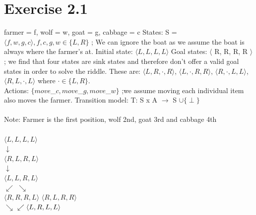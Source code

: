 \documentclass[12pt]{article}
\begin{document}
\section*{Exercise 2.1}
farmer = f, wolf = w, goat = g, cabbage = c \newline \newline
States:  S = $\langle f, w, g, c \rangle, f, c, g, w \in \{ L, R \}$ ; We can ignore the boat as we assume the boat is always where the farmer's at.\newline
Initial state: $\langle L, L, L, L \rangle$ \newline
Goal states: $\langle$ R, R, R, R $\rangle$ ; we find that four states are sink states and therefore don't offer a valid goal states in order to solve the riddle. These are: $\langle L, R, \cdot , R \rangle$, $\langle L, \cdot , R, R \rangle$, $\langle R, \cdot, L, L \rangle$, $\langle R, L, \cdot, L \rangle$ where $\cdot \in \{ L, R \}.$ \\
Actions: $\{ move$\_$c, move$\_$g, move$\_$w\}$ ;we assume moving each individual item also moves the farmer.  \newline
Transition model: T: S x A $\to$ S $\cup \{\perp \}$ \\ \\ 
Note: Farmer is the first position, wolf 2nd, goat 3rd and cabbage 4th \\ \\\hspace*{25mm}%
$\langle L,L,L,L \rangle$ \\ \hspace*{35mm}%
$ \downarrow$ \\ \hspace*{25mm}%
$\langle R,L,R,L \rangle$ \\ \hspace*{35mm}%
$\downarrow$ \\ \hspace*{25mm}%
$\langle L,L,R,L \rangle$ \\ \hspace*{10mm}%
$\swarrow$ \hspace*{40mm}%
$\searrow$ \\
$\langle R,R,R,L \rangle$ \hspace*{25mm}%
$\langle R,L,R,R \rangle$ \\ \hspace*{10mm}%
$\searrow$ \hspace*{40mm}%
$\swarrow \\ \\ \langle L,R,L,L \rangle$ \hspace*{25mm}%
\end{document}
